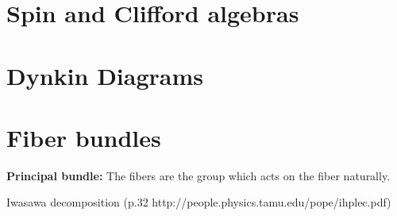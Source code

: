 \documentclass{article}
\begin{document}
\tableofcontents

\section{Spin and Clifford algebras}


\section{Dynkin Diagrams}

\section{Fiber bundles}
    
    \textbf{Principal bundle:} The fibers are the group which acts on the fiber naturally. 
    
    
    Iwasawa decomposition (p.32 http://people.physics.tamu.edu/pope/ihplec.pdf)
\end{document}
